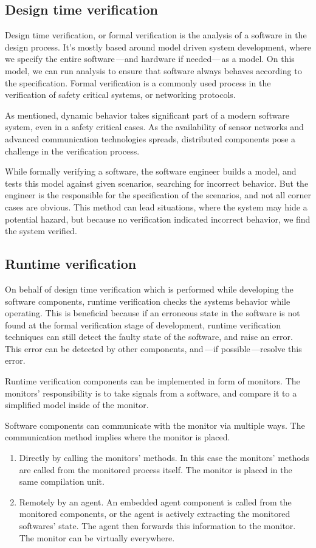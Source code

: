 \subsection{Design time verification}

Design time verification, or formal verification is the analysis of a software in the design process. It's mostly based around model driven system development, where we specify the entire software\,---and hardware if needed---\,as a model. On this model, we can run analysis to ensure that software always behaves according to the specification. Formal verification is a commonly used process in the verification of safety critical systems, or networking protocols.

As mentioned, dynamic behavior takes significant part of a modern software system, even in a safety critical cases. As the availability of sensor networks and advanced communication technologies spreads, distributed components pose a challenge in the verification process.

While formally verifying a software, the software engineer builds a model, and tests this model against given scenarios, searching for incorrect behavior. But the engineer is the responsible for the specification of the scenarios, and not all corner cases are obvious. This method can lead situations, where the system may hide a potential hazard, but because no verification indicated incorrect behavior, we find the system verified.

\subsection{Runtime verification}

On behalf of design time verification which is performed while developing the software components, runtime verification checks the systems behavior while operating. This is beneficial because if an erroneous state in the software is not found at the formal verification stage of development, runtime verification techniques can still detect the faulty state of the software, and raise an error. This error can be detected by other components, and\,---if possible\,---resolve this error.

Runtime verification components can be implemented in form of monitors. The monitors' responsibility is to take signals from a software, and compare it to a simplified model inside of the monitor.

Software components can communicate with the monitor via multiple ways. The communication method implies where the monitor is placed.
\begin{enumerate}
	\item Directly by calling the monitors' methods. In this case the monitors' methods are called from the monitored process itself. The monitor is placed in the same compilation unit.
	\item\label{item:agent} Remotely by an agent. An embedded agent component is called from the monitored components, or the agent is actively extracting the monitored softwares' state. The agent then forwards this information to the monitor. The monitor can be virtually everywhere.
\end{enumerate}

